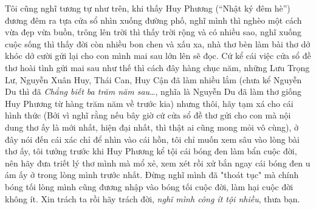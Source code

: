 \documentclass[../main.tex]{subfiles}
\begin{document}
\begin{multicols}{2}
Tôi cũng nghĩ tương tự như trên, khi thấy Huy Phương (“Nhật ký đêm hè”) đương đêm ra tựa cửa sổ nhìn xuống đường phố, nghĩ mình thì nghèo một cách vừa đẹp vừa buồn, trông lên trời thì thấy trời rộng và có nhiều sao, nghĩ xuống cuộc sống thì thấy đời còn nhiều bon chen và xấu xa, nhà thơ bèn làm bài thơ dở khóc dở cười gửi lại cho con mình mai sau lớn lên sẽ đọc. Cứ kể cái việc cửa sổ đề thơ hoài tình gửi mai sau như thế thì cách đây hàng chục năm, những Lưu Trọng Lư, Nguyễn Xuân Huy, Thái Can, Huy Cận đã làm nhiều lắm (chưa kể Nguyễn Du thì đã \textit{Chẳng biết ba trăm năm sau}…, nghĩa là Nguyễn Du đã làm thơ giống Huy Phương từ hàng trăm năm về trước kia) nhưng thôi, hãy tạm xá cho cái hình thức (Bởi vì nghĩ rằng nếu bây giờ cứ cửa sổ đề thơ gửi cho con mà nội dung thơ ấy là mới nhất, hiện đại nhất, thì thật ai cũng mong mỏi vô cùng), ở đây nói đến cái xác chỉ để nhìn vào cái hồn, tôi chỉ muốn xem sâu vào lòng bài thơ ấy, tôi tưởng trước khi Huy Phương kể tội cái bóng đen làm bẩn cuộc đời, nên hãy đưa triết lý thơ mình mà mổ xẻ, xem xét rồi xử bắn ngay cái bóng đen u ám ấy ở trong lòng mình trước nhất. Đừng nghĩ mình đã "thoát tục" mà chính bóng tối lòng mình cũng đương nhập vào bóng tối cuộc đời, làm hại cuộc đời không ít. Xin trách ta rồi hãy trách đời, \textit{nghĩ mình công ít tội nhiều}, thưa bạn. 
 

\end{multicols}
\end{document}
